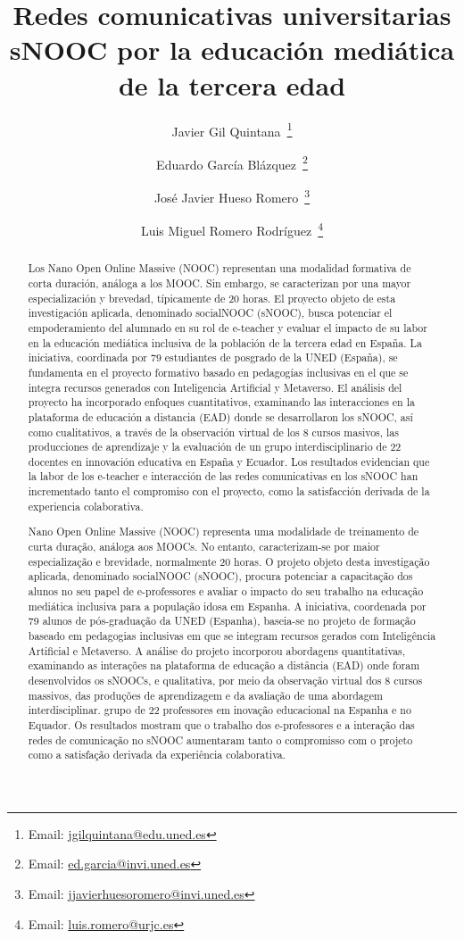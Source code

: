 \documentclass[spanish]{textolivre}
\title{Redes comunicativas universitarias sNOOC por la educación mediática de la tercera edad}
\author[1,2]{Javier Gil Quintana~\orcid{0000-0003-0326-2535}\thanks{Email: \href{mailto:jgilquintana@edu.uned.es}{jgilquintana@edu.uned.es}}}
\author[2]{Eduardo García Blázquez~\orcid{0000-0003-1229-3229}\thanks{Email: \href{mailto:ed.garcia@invi.uned.es}{ed.garcia@invi.uned.es}}}
\author[2]{José Javier Hueso Romero~\orcid{0000-0003-1375-2028}\thanks{Email: \href{mailto:jjavierhuesoromero@invi.uned.es}{jjavierhuesoromero@invi.uned.es}}}
\author[1]{Luis Miguel Romero Rodríguez~\orcid{0000-0003-3924-1517}\thanks{Email: \href{mailto:luis.romero@urjc.es}{luis.romero@urjc.es}}}
\affil[1]{Universidad Rey Juan Carlos, Facultad Ciencias de la Comunicación, Madrid, España.}
\affil[2]{Universidad Nacional de Educación a Distancia, Facultad de Educación, Madrid, España.}
\begin{document}
\maketitle
\begin{polyabstract}
\begin{abstract}
Los Nano Open Online Massive (NOOC) representan una modalidad formativa de corta duración, análoga a los MOOC. Sin embargo, se caracterizan por una mayor especialización y brevedad, típicamente de 20 horas. El proyecto objeto de esta investigación aplicada, denominado socialNOOC (sNOOC), busca potenciar el empoderamiento del alumnado en su rol de e-teacher y evaluar el impacto de su labor en la educación mediática inclusiva de la población de la tercera edad en España. La iniciativa, coordinada por 79 estudiantes de posgrado de la UNED (España), se fundamenta en el proyecto formativo basado en pedagogías inclusivas en el que se integra recursos generados con Inteligencia Artificial y Metaverso. El análisis del proyecto ha incorporado enfoques cuantitativos, examinando las interacciones en la plataforma de educación a distancia (EAD) donde se desarrollaron los sNOOC, así como cualitativos, a través de la observación virtual de los 8 cursos masivos, las producciones de aprendizaje y la evaluación de un grupo interdisciplinario de 22 docentes en innovación educativa en España y Ecuador. Los resultados evidencian que la labor de los e-teacher e interacción de las redes comunicativas en los sNOOC han incrementado tanto el compromiso con el proyecto, como la satisfacción derivada de la experiencia colaborativa.


\end{abstract}

\begin{portuguese}
\begin{abstract}
Nano Open Online Massive (NOOC) representa uma modalidade de treinamento de curta duração, análoga aos MOOCs. No entanto, caracterizam-se por maior especialização e brevidade, normalmente 20 horas. O projeto objeto desta investigação aplicada, denominado socialNOOC (sNOOC), procura potenciar a capacitação dos alunos no seu papel de e-professores e avaliar o impacto do seu trabalho na educação mediática inclusiva para a população idosa em Espanha. A iniciativa, coordenada por 79 alunos de pós-graduação da UNED (Espanha), baseia-se no projeto de formação baseado em pedagogias inclusivas em que se integram recursos gerados com Inteligência Artificial e Metaverso. A análise do projeto incorporou abordagens quantitativas, examinando as interações na plataforma de educação a distância (EAD) onde foram desenvolvidos os sNOOCs, e qualitativa, por meio da observação virtual dos 8 cursos massivos, das produções de aprendizagem e da avaliação de uma abordagem interdisciplinar. grupo de 22 professores em inovação educacional na Espanha e no Equador. Os resultados mostram que o trabalho dos e-professores e a interação das redes de comunicação no sNOOC aumentaram tanto o compromisso com o projeto como a satisfação derivada da experiência colaborativa.


\end{abstract}
\end{portuguese}
\end{polyabstract}
\end{document}
